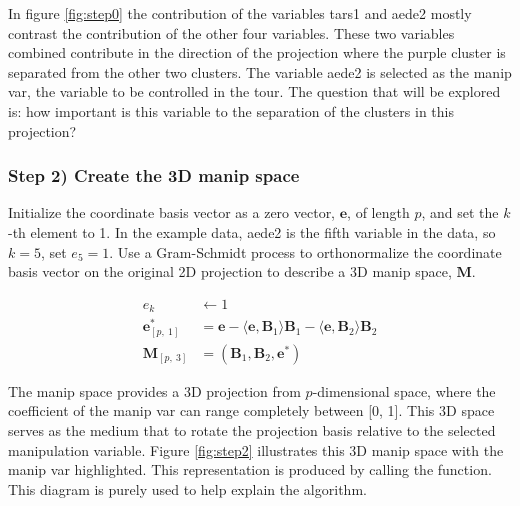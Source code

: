 In figure \ref{fig:step0} the contribution of the variables tars1 and
aede2 mostly contrast the contribution of the other four variables.
These two variables combined contribute in the direction of the
projection where the purple cluster is separated from the other two
clusters. The variable aede2 is selected as the manip var, the variable
to be controlled in the tour. The question that will be explored is: how
important is this variable to the separation of the clusters in this
projection?

\hypertarget{step-2-create-the-3d-manip-space}{%
\subsubsection{Step 2) Create the 3D manip
space}\label{step-2-create-the-3d-manip-space}}

Initialize the coordinate basis vector as a zero vector, \(\textbf{e}\),
of length \(p\), and set the \(k\)-th element to 1. In the example data,
aede2 is the fifth variable in the data, so \(k=5\), set \(e_5=1\). Use
a Gram-Schmidt process to orthonormalize the coordinate basis vector on
the original 2D projection to describe a 3D manip space, \(\textbf{M}\).

\begin{align*}
  e_k &\leftarrow 1 \\ 
  \textbf{e}^*_{[p,~1]} &= \textbf{e} - \langle \textbf{e}, \textbf{B}_1 \rangle \textbf{B}_1 - \langle \textbf{e}, \textbf{B}_2 \rangle \textbf{B}_2 \\ 
  \textbf{M}_{[p,~3]} &= (\textbf{B}_1,\textbf{B}_2,\textbf{e}^*)
\end{align*}

The manip space provides a 3D projection from \(p\)-dimensional space,
where the coefficient of the manip var can range completely between
{[}0, 1{]}. This 3D space serves as the medium that to rotate the
projection basis relative to the selected manipulation variable. Figure
\ref{fig:step2} illustrates this 3D manip space with the manip var
highlighted. This representation is produced by calling the
 function. This diagram is purely used to
help explain the algorithm.

